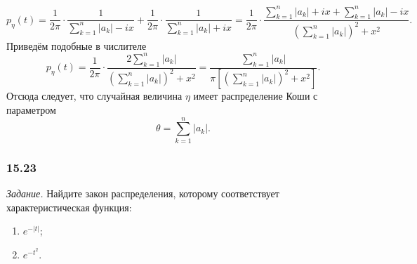 $$p_{ \eta } \left( t \right) =
\frac{1}{2 \pi } \cdot \frac{1}{ \sum \limits_{k = 1}^n \left| a_k \right| - ix} + \frac{1}{2 \pi } \cdot \frac{1}{ \sum \limits_{k = 1}^n \left| a_k \right| + ix} =
\frac{1}{2 \pi } \cdot
\frac{ \sum \limits_{k = 1}^n \left| a_k \right| + ix + \sum \limits_{k = 1}^n \left| a_k \right| - ix}{ \left( \sum \limits_{k = 1}^n \left| a_k \right| \right)^2 + x^2}.$$
Приведём подобные в числителе
$$p_{ \eta } \left( t \right) =
\frac{1}{2 \pi } \cdot \frac{2 \sum \limits_{k = 1}^n \left| a_k \right| }{\left( \sum \limits_{k = 1}^n \left| a_k \right| \right)^2 + x^2} =
\frac{ \sum \limits_{k = 1}^n \left| a_k \right| }{ \pi \left[ \left( \sum \limits_{k = 1}^n \left| a_k \right| \right)^2 + x^2 \right] }.$$
Отсюда следует, что случайная величина $ \eta $ имеет распределение Коши с параметром
$$ \theta =
\sum \limits_{k = 1}^n \left| a_k \right|.$$

\subsubsection*{15.23}

\textit{Задание.} Найдите закон распределения, которому соответствует характеристическая функция:
\begin{enumerate}[label=\alph*)]
\item $e^{- \left| t \right| }$;
\item $e^{- t^2}$.
\end{enumerate}

